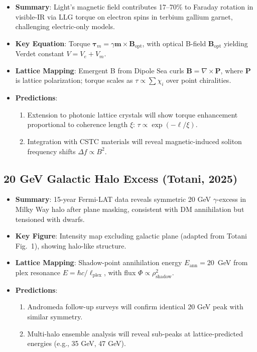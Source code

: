 \documentclass[11pt,a4paper]{article}
\begin{document}
\begin{itemize}
\item \textbf{Summary}: Light's magnetic field contributes 17--70\% to Faraday rotation in visible-IR via LLG torque on electron spins in terbium gallium garnet, challenging electric-only models.

\item \textbf{Key Equation}: Torque $\boldsymbol{\tau}_m = \gamma \mathbf{m} \times \mathbf{B}_{\mathrm{opt}}$, with optical B-field $\mathbf{B}_{\mathrm{opt}}$ yielding Verdet constant $V = V_e + V_m$.

\item \textbf{Lattice Mapping}: Emergent B from Dipole Sea curls $\mathbf{B} = \nabla \times \mathbf{P}$, where $\mathbf{P}$ is lattice polarization; torque scales as $\tau \propto \sum \chi_i$ over point chiralities.

\item \textbf{Predictions}:
\begin{enumerate}
\item Extension to photonic lattice crystals will show torque enhancement proportional to coherence length $\xi$: $\tau \propto \exp(-\ell / \xi)$.
\item Integration with CSTC materials will reveal magnetic-induced soliton frequency shifts $\Delta f \propto B^2$.
\end{enumerate}
\end{itemize}

\subsection{20 GeV Galactic Halo Excess (Totani, 2025)}

\begin{itemize}
\item \textbf{Summary}: 15-year Fermi-LAT data reveals symmetric 20 GeV $\gamma$-excess in Milky Way halo after plane masking, consistent with DM annihilation but tensioned with dwarfs.

\item \textbf{Key Figure}: Intensity map excluding galactic plane (adapted from Totani Fig.\ 1), showing halo-like structure.

\item \textbf{Lattice Mapping}: Shadow-point annihilation energy $E_{\mathrm{ann}} = 20$~GeV from plex resonance $E = \hbar c / \ell_{\mathrm{plex}}$, with flux $\Phi \propto \rho_{\mathrm{shadow}}^2$.

\item \textbf{Predictions}:
\begin{enumerate}
\item Andromeda follow-up surveys will confirm identical 20 GeV peak with similar symmetry.
\item Multi-halo ensemble analysis will reveal sub-peaks at lattice-predicted energies (e.g., 35 GeV, 47 GeV).
\end{enumerate}
\end{itemize}
\end{document}
